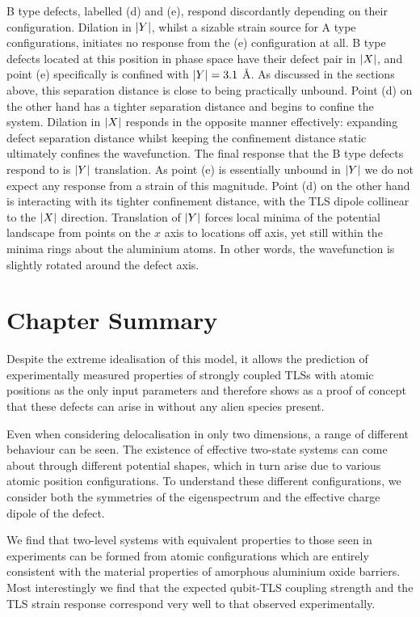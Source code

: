 B type defects, labelled (d) and (e), respond discordantly depending on their configuration.
Dilation in $\lvert Y\rvert$, whilst a sizable strain source for A type configurations, initiates no response from the (e) configuration at all.
B type defects located at this position in phase space have their defect pair in $\lvert X\rvert$, and point (e) specifically is confined with $\lvert Y\rvert = 3.1$ \AA.
As discussed in the sections above, this separation distance is close to being practically unbound.
Point (d) on the other hand has a tighter separation distance and begins to confine the system.
Dilation in $\lvert X\rvert$ responds in the opposite manner effectively: expanding defect separation distance whilst keeping the confinement distance static ultimately confines the wavefunction.
The final response that the B type defects respond to is $\lvert Y\rvert$ translation.
As point (e) is essentially unbound in $\lvert Y\rvert$ we do not expect any response from a strain of this magnitude.
Point (d) on the other hand is interacting with its tighter confinement distance, with the TLS dipole collinear to the $\lvert X\rvert$ direction.
Translation of $\lvert Y\rvert$ forces local minima of the potential landscape from points on the $x$ axis to locations off axis, yet still within the minima rings about the aluminium atoms.
In other words, the wavefunction is slightly rotated around the defect axis.

\section{Chapter Summary}

Despite the extreme idealisation of this model, it allows the prediction of experimentally measured properties of strongly coupled TLSs with atomic positions as the only input parameters and therefore shows as a proof of concept that these defects can arise in  without any alien species present.

Even when considering delocalisation in only two dimensions, a range of different behaviour can be seen.
The existence of effective two-state systems can come about through different potential shapes, which in turn arise due to various atomic position configurations.
To understand these different configurations, we consider both the symmetries of the eigenspectrum and the effective charge dipole of the defect.

We find that two-level systems with equivalent properties to those seen in experiments can be formed from atomic configurations which are entirely consistent with the material properties of amorphous aluminium oxide barriers.
Most interestingly we find that the expected qubit-TLS coupling strength and the TLS strain response correspond very well to that observed experimentally.

